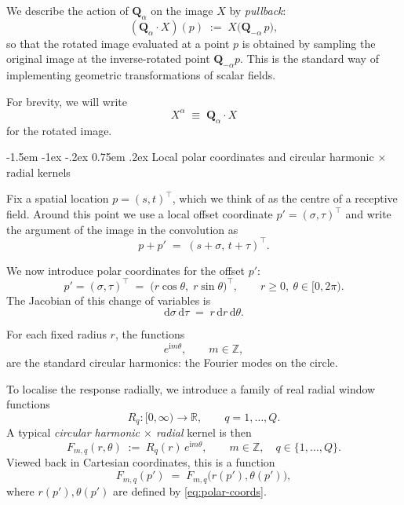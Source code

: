 \documentclass[12pt]{article}
\makeatletter
\renewcommand\subsection{\@startsection{subsection}{2}{\z@}%
                                     {-1.5em \@plus -1ex \@minus -.2ex}%
                                     {0.75em \@plus .2ex}%
                                     {\normalfont\large\bfseries}}
\makeatother
\begin{document}
We describe the action of $\mathbf{Q}_\alpha$ on the image $X$ by
\emph{pullback}:
\begin{equation}
  \label{eq:rotation-action-on-image}
  (\mathbf{Q}_\alpha \cdot X)(p)
  \;:=\;
  X\bigl(\mathbf{Q}_{-\alpha}\,p\bigr),
\end{equation}
so that the rotated image evaluated at a point $p$ is obtained by
sampling the original image at the inverse-rotated point
$\mathbf{Q}_{-\alpha} p$. This is the standard way of implementing
geometric transformations of scalar fields.

For brevity, we will write
\[
  X^\alpha \;\equiv\; \mathbf{Q}_\alpha \cdot X
\]
for the rotated image.

\subsection{Local polar coordinates and circular harmonic \texorpdfstring{$\times$}{x} radial kernels}

Fix a spatial location $p = (s,t)^\top$, which we think of as the
centre of a receptive field. Around this point we use a local offset
coordinate $p' = (\sigma,\tau)^\top$ and write the argument of the
image in the convolution as
\[
  p + p'
  \;=\;
  (s + \sigma,\, t + \tau)^\top.
\]

We now introduce polar coordinates for the offset $p'$:
\begin{equation}
  \label{eq:polar-coords}
  p' = (\sigma,\tau)^\top
  \;=\;
  \bigl(r\cos\theta,\; r\sin\theta\bigr)^\top,
  \qquad
  r \ge 0,\ \theta \in [0,2\pi).
\end{equation}
The Jacobian of this change of variables is
\[
  \mathrm{d}\sigma\,\mathrm{d}\tau
  \;=\;
  r\,\mathrm{d}r\,\mathrm{d}\theta.
\]

For each fixed radius $r$, the functions
\begin{equation}
  \label{eq:circular-harmonics}
  e^{\mathrm{i}m\theta}, \qquad m \in \mathbb{Z},
\end{equation}
are the standard circular harmonics: the Fourier modes on the circle.

To localise the response radially, we introduce a family of real
radial window functions
\[
  R_q : [0,\infty) \to \mathbb{R},
  \qquad q = 1,\dots,Q.
\]
A typical \emph{circular harmonic $\times$ radial} kernel is then
\begin{equation}
  \label{eq:Fr-theta-definition}
  F_{m,q}(r,\theta)
  \;:=\;
  R_q(r)\,e^{\mathrm{i}m\theta},
  \qquad m \in \mathbb{Z},\quad q\in\{1,\dots,Q\}.
\end{equation}
Viewed back in Cartesian coordinates, this is a function
\[
  F_{m,q}(p')
  \;=\;
  F_{m,q}\bigl(r(p'), \theta(p')\bigr),
\]
where $r(p'),\theta(p')$ are defined by
\eqref{eq:polar-coords}.
\end{document}
